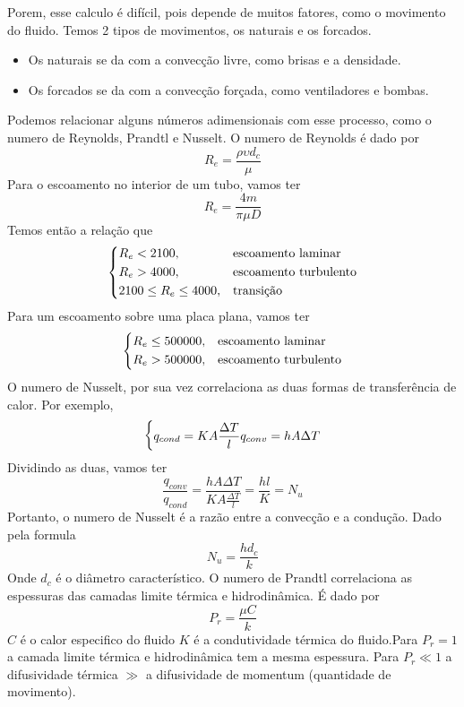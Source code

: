 Porem, esse calculo é difícil, pois depende de muitos fatores, como o movimento do fluido. Temos 2
tipos de movimentos, os naturais e os forcados. 
\begin{itemize}
    \item {Os naturais se da com a convecção livre, como brisas e a densidade.}
    \item {Os forcados se da com a convecção forçada, como ventiladores e bombas.}
\end{itemize}
Podemos relacionar alguns números  adimensionais com esse processo, como o numero de Reynolds,
Prandtl e Nusselt. O numero de Reynolds é dado por
\begin{equation}
    R_e = \frac{\rho \upsilon d_c}{\mu}
\end{equation}
Para o escoamento no interior de um tubo, vamos ter
\begin{equation}
    R_e = \frac{4m}{\pi \mu D }
\end{equation}
Temos então a relação que
\begin{align}
    \begin{dcases}
        R_e < 2100 ,& \text{escoamento laminar}\\
        R_e > 4000 ,& \text{escoamento turbulento}\\
        2100 \leq  R_e \leq  4000 ,& \text{transição}
    \end{dcases} 
\end{align}
Para um escoamento sobre uma placa plana, vamos ter
\begin{align}
    \begin{dcases}
        R_e \leq  500000 ,& \text{escoamento laminar}\\
        R_e > 500000 ,& \text{escoamento turbulento}
    \end{dcases}
\end{align}
O numero de Nusselt, por sua vez correlaciona as duas formas de transferência de calor. Por exemplo,
\begin{align}
    \begin{dcases}
        q_{cond} = KA \frac{\Delta T}{l}
        q_{conv} = hA\Delta T
    \end{dcases} 
\end{align}
Dividindo as duas, vamos ter
\begin{equation}
    \frac{q_{conv}}{q_{cond}} = \frac{hA\Delta T}{KA \frac{\Delta T}{l}} = \frac{hl}{K} = N_u
\end{equation}
Portanto, o numero de Nusselt é a razão entre a convecção e a condução. Dado pela formula
\begin{equation}
    N_u = \frac{hd_c}{k}
\end{equation}
Onde \(d_c\) é o diâmetro característico. O numero de Prandtl  correlaciona as espessuras das
camadas limite térmica e hidrodinâmica. É dado por
\begin{equation}
    P_r = \frac{\mu C}{k}
\end{equation}
\(C\) é o calor especifico do fluido \(K\) é a condutividade térmica do fluido.Para \(P_r = 1\) a
camada limite térmica e hidrodinâmica tem a mesma espessura. Para \(P_r \ll 1\) a difusividade
térmica \( \gg \) a difusividade de momentum (quantidade de movimento). 
